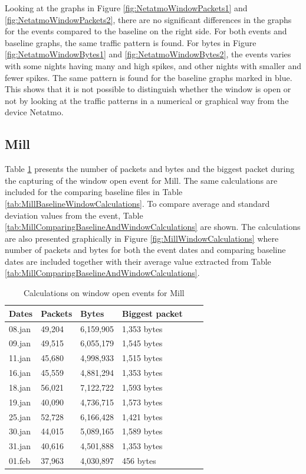 Looking at the graphs in Figure \ref{fig:NetatmoWindowPackets1} and \ref{fig:NetatmoWindowPackets2}, there are no significant differences in the graphs for the events compared to the baseline on the right side. For both events and baseline graphs, the same traffic pattern is found. For bytes in Figure \ref{fig:NetatmoWindowBytes1} and \ref{fig:NetatmoWindowBytes2}, the events varies with some nights having many and high spikes, and other nights with smaller and fewer spikes. The same pattern is found for the baseline graphs marked in blue. This shows that it is not possible to distinguish whether the window is open or not by looking at the traffic patterns in a numerical or graphical way from the device Netatmo. 

\newpage
\subsection{Mill}
Table \ref{tab:MillWindowCalculations} presents the number of packets and bytes and the biggest packet during the capturing of the window open event for Mill. The same calculations are included for the comparing baseline files in Table \ref{tab:MillBaselineWindowCalculations}. To compare average and standard deviation values from the event, Table \ref{tab:MillComparingBaselineAndWindowCalculations} are shown. The calculations are also presented graphically in Figure \ref{fig:MillWindowCalculations} where number of packets and bytes for both the event dates and comparing baseline dates are included together with their average value extracted from Table \ref{tab:MillComparingBaselineAndWindowCalculations}.

\begin{table}[H]
    \centering
    \caption{Calculations on window open events for Mill}
    \begin{tabular}{|l|l|l|l|l|l|}
    \hline
        \textbf{Dates} & \textbf{Packets} & \textbf{Bytes} & \textbf{Biggest packet} \\ \hline
        08.jan & 49,204 & 6,159,905 & 1,353 bytes   \\ \hline
        09.jan & 49,515 & 6,055,179 & 1,545 bytes   \\ \hline
        11.jan & 45,680 & 4,998,933 & 1,515 bytes   \\ \hline
        16.jan & 45,559 & 4,881,294 & 1,353 bytes \\ \hline
        18.jan & 56,021 & 7,122,722 & 1,593 bytes   \\ \hline
        19.jan & 40,090 & 4,736,715 & 1,573 bytes \\ \hline
        25.jan & 52,728 & 6,166,428 & 1,421 bytes \\ \hline
        30.jan & 44,015 & 5,089,165 & 1,589 bytes  \\ \hline
        31.jan & 40,616 & 4,501,888 & 1,353 bytes \\ \hline
        01.feb & 37,963 & 4,030,897 & 456 bytes \\ \hline
    \end{tabular}
    \label{tab:MillWindowCalculations}
\end{table}

